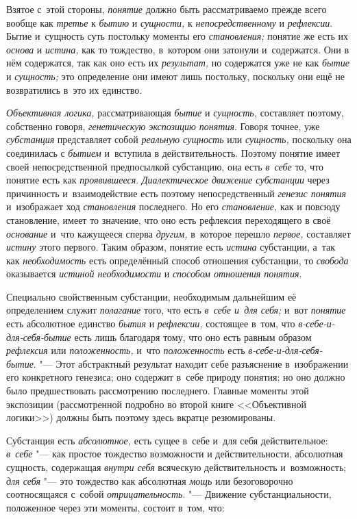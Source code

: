 Взятое с~этой стороны, {\em понятие} должно быть рассматриваемо прежде всего
вообще как {\em третье} к {\em бытию} и {\em сущности,} к
{\em непосредственному} и {\em рефлексии}. Бытие и~сущность суть постольку
моменты его {\em становления;} понятие же есть их {\em основа} и
{\em истина,} как то тождество, в~котором они затонули и~содержатся. Они в
нём содержатся, так как оно есть их {\em результат,} но содержатся уже не
как {\em бытие} и {\em сущность;} это определение они имеют лишь постольку,
поскольку они ещё не возвратились в~это их единство.

{\em Объективная логика,} рассматривающая {\em бытие} и {\em сущность,}
составляет поэтому, собственно говоря, {\em генетическую экспозицию понятия}.
Говоря точнее, уже {\em субстанция} представляет собой {\em реальную сущность}
или {\em сущность,} поскольку она соединилась с {\em бытием} и~вступила в
действительность. Поэтому понятие имеет своей непосредственной предпосылкой
субстанцию, она есть {\em в~себе} то, что понятие есть как {\em проявившееся}.
{\em Диалектическое движение субстанции} через причинность и~взаимодействие
есть поэтому непосредственный {\em генезис понятия} и~изображает ход
{\em становления} последнего. Но его {\em становление,} как и
повсюду становление, имеет то значение, что оно есть рефлексия переходящего
в своё {\em основание} и~что кажущееся сперва {\em другим,} в~которое перешло
{\em первое,} составляет {\em истину} этого первого. Таким образом, понятие есть
{\em истина} субстанции, а~так как {\em необходимость} есть определённый
способ отношения субстанции, то {\em свобода} оказывается {\em истиной
необходимости} и {\em способом отношения понятия}.

Специально свойственным субстанции, необходимым дальнейшим её определением
служит {\em полагание} того, что есть {\em в~себе и~для себя;} и~вот
{\em понятие} есть абсолютное единство {\em бытия} и {\em рефлексии,}
состоящее в~том, что {\em в-себе-и-для-себя-бытие} есть лишь благодаря тому,
что оно есть равным образом {\em рефлексия} или {\em положенность,} и~что
{\em положенность} есть {\em в-себе-и-для-себя-бытие}. "--- Этот абстрактный
результат находит себе разъяснение в~изображении его конкретного генезиса;
оно содержит в~себе природу понятия; но оно должно было предшествовать
рассмотрению последнего. Главные моменты этой экспозиции (рассмотренной
подробно во второй книге <<Объективной логики>>) должны быть поэтому здесь
вкратце резюмированы.

Субстанция есть {\em абсолютное,} есть сущее в~себе и~для себя
действительное: {\em в~себе} "--- как простое тождество возможности и
действительности, абсолютная сущность, содержащая {\em внутри себя}
всяческую действительность и~возможность; {\em для себя} "--- это
тождество как абсолютная {\em мощь} или безоговорочно соотносящаяся с~собой
{\em отрицательность}. "--- Движение субстанциальности, положенное через эти
моменты, состоит в~том, что:

